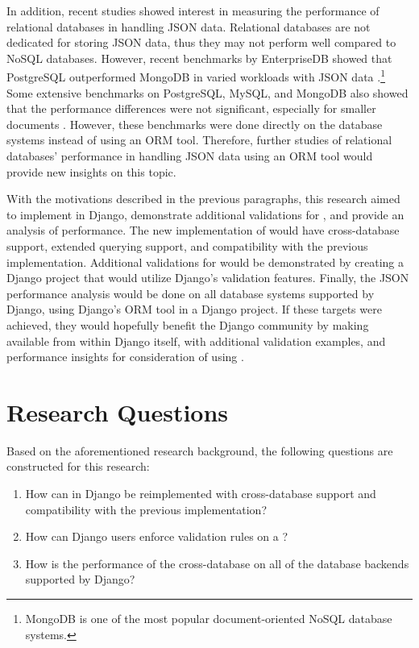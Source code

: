 In addition, recent studies showed interest in measuring the performance of
relational databases in handling JSON data. Relational databases are not
dedicated for storing JSON data, thus they may not perform well compared to
NoSQL databases. However, recent benchmarks by EnterpriseDB showed that
PostgreSQL outperformed MongoDB in varied workloads with JSON data
\cite{enterprisedb_benchmark}.\footnote{MongoDB is one of the most popular
document-oriented NoSQL database systems.} Some extensive benchmarks on
PostgreSQL, MySQL, and MongoDB also showed that the performance differences
were not significant, especially for smaller documents \cite{dolgov_benchmark}.
However, these benchmarks were done directly on the database systems instead of
using an ORM tool. Therefore, further studies of relational databases'
performance in handling JSON data using an ORM tool would provide new insights
on this topic.

With the motivations described in the previous paragraphs, this research aimed
to implement  in Django, demonstrate additional validations for
, and provide an analysis of  performance. The
new implementation of  would have cross-database support,
extended querying support, and compatibility with the previous 
implementation. Additional validations for  would be
demonstrated by creating a Django project that would utilize Django's
validation features. Finally, the JSON performance analysis would be done on
all database systems supported by Django, using Django's ORM tool in a Django
project. If these targets were achieved, they would hopefully benefit the
Django community by making  available from within Django
itself, with additional validation examples, and performance insights for
consideration of using .

\section{Research Questions}

Based on the aforementioned research background, the following questions are
constructed for this research:

\begin{enumerate}
    \item How can  in Django be reimplemented with
          cross-database support and compatibility with the previous
           implementation?
    \item How can Django users enforce validation rules on a ?
    \item How is the performance of the cross-database  on all
          of the database backends supported by Django?
\end{enumerate}


